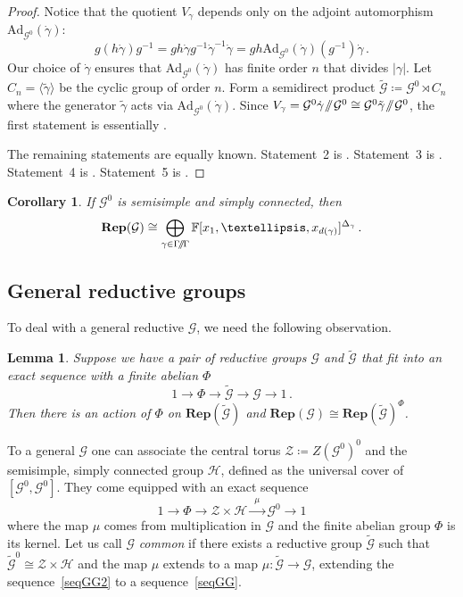 \documentclass[10pt]{article}
\newcommand{\Rep}{\mathbf{Rep}}
\newtheorem{cor}{Corollary}
\newtheorem{lem}{Lemma}
\theoremstyle{definition}
\theoremstyle{remark}
\newcommand{\bF}{{\mathbb F}}
\newcommand{\cG}{{{\mathcal G}}}
\newcommand{\cH}{{{\mathcal H}}}
\newcommand{\cZ}{{{\mathcal Z}}}
\newcommand{\sslash}{\mathbin{/\mkern-6mu/}}
\newcommand{\AdRumynin}{{{\mathrm A}{\mathrm d}_{\cG^0}}}
\newcommand{\wG}{{\widetilde{\cG}}}
\begin{document}
\begin{proof}
  Notice that the quotient $V_{\gamma}$ depends only on the adjoint automorphism $\AdRumynin (\dot{\gamma})$:
  \[ g (h \dot{\gamma}) g^{-1} = g h \dot{\gamma} g^{-1}\dot{\gamma}^{-1} \dot{\gamma} =
g h \AdRumynin (\dot{\gamma})(g^{-1}) \dot{\gamma} \, .
  \] 
  Our choice of $\dot{\gamma}$ ensures that  $\AdRumynin (\dot{\gamma})$ has finite order $n$ that divides $|\gamma|$.
  Let $C_n = \langle \tilde{\gamma} \rangle$ be the cyclic group of order $n$.
  Form a semidirect product $\widetilde{\cG} \coloneqq \cG^0 \rtimes C_n$ where the generator $\tilde{\gamma}$ acts via  $\AdRumynin (\dot{\gamma})$.
  Since $V_\gamma = \cG^0 \dot{\gamma} \!\sslash\! \cG^{0} \cong \cG^0 \tilde{\gamma} \!\sslash\! \cG^{0}$, the first statement is essentially \cite[Th. 1.1]{diss}.

  The remaining statements are equally known. Statement~2 is \cite[Th. 1.3]{diss}. 
  Statement~3 is \cite[Th. 1]{Spr}. Statement~4 is \cite[Cor. 2]{Spr}. 
  Statement~5 is \cite[Th. 1.2]{diss}. 
\end{proof}
\begin{cor}
  If $\cG^0$ is semisimple and simply connected, then
  \[
  \Rep (\cG) \cong \bigoplus_{\gamma \in \Gamma\!\sslash\!\Gamma}   \bF[x_1, \ldots , x_{d(\gamma)}]^{\Delta_\gamma} \, .
  \]
\end{cor}
  

\subsection{General reductive groups}
To deal with a general reductive $\cG$, we need the following observation.
\begin{lem} \label{seqREP}
Suppose we have a pair of reductive groups $\cG$ and $\wG$ that fit into an exact sequence with a finite abelian $\Phi$ 
\begin{equation} \label{seqGG}
1 \rightarrow \Phi \longrightarrow \wG \longrightarrow  \cG \rightarrow 1 \, . 
\end{equation}
Then there is an action of $\Phi$ on $\Rep (\wG)$ and $\Rep (\cG)\cong \Rep (\wG)^{\Phi}$.
\end{lem}
To a general $\cG$ one can associate the central torus $\cZ\coloneqq Z(\cG^0)^0$ and the semisimple,
simply connected group $\cH$,
defined as the universal cover of $[\cG^0,\cG^0]$. They come equipped with an exact sequence
\begin{equation} \label{seqGG2}
1 \rightarrow \Phi \longrightarrow \cZ \times \cH \xrightarrow{\ \ \mu \ \ }  \cG^0 \rightarrow 1
\end{equation}
where the map $\mu$ comes from multiplication in $\cG$ and the finite abelian group $\Phi$ is its kernel. Let us call $\cG$ {\em common}
if there exists a reductive group $\wG$ such that
$\wG^0 \cong \cZ \times \cH$ and the map $\mu$ extends to a map $\mu: \wG \rightarrow  \cG$,
extending the sequence~\eqref{seqGG2} to a sequence~\eqref{seqGG}.
\end{document}

